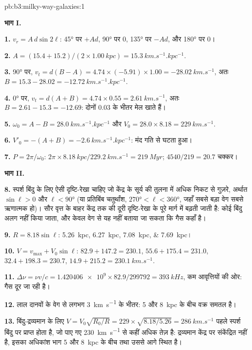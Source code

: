 \begin{solution}{pb:b3:milky-way-galaxies:1}

\textbf{भाग I.}

\textbf{1.} $v_r = A\,d\sin2\ell$: \ang{45} पर $+A d$, \ang{90} पर 0, \ang{135} पर
$-A d$, और \ang{180} पर 0।

\textbf{2.} $A = (15.4 + 15.2)/(2\times\qty{1.00}{kpc}) =
\qty{15.3}{km.s^{-1}.kpc^{-1}}$.

\textbf{3.} \ang{90} पर, $v_t = d(B - A) = 4.74\times(-5.91)\times1.00 =
\qty{-28.02}{km.s^{-1}}$, अतः $B = 15.3 - 28.02 =
\qty{-12.72}{km.s^{-1}.kpc^{-1}}$.

\textbf{4.} \ang{0} पर, $v_t = d(A + B) = 4.74\times0.55 =
\qty{2.61}{km.s^{-1}}$, अतः $B = 2.61 - 15.3 = \num{-12.69}$: दोनों
\num{0.03} के भीतर मेल खाते हैं।

\textbf{5.} $\omega_0 = A - B = \qty{28.0}{km.s^{-1}.kpc^{-1}}$ और
$V_0 = 28.0\times8.18 = \qty{229}{km.s^{-1}}$.

\textbf{6.} $V'_0 = -(A + B) = \qty{-2.6}{km.s^{-1}.kpc^{-1}}$: मंद गति से घटता हुआ।

\textbf{7.} $P = 2\pi/\omega_0$: $2\pi\times\qty{8.18}{kpc}/\qty{229.2}{km.s^{-1}}
= \qty{219}{Myr}$; $4540/219 = 20.7$ चक्कर।

\textbf{भाग II.}

\textbf{8.} स्पर्श बिंदु के लिए ऐसी दृष्टि-रेखा चाहिए जो केंद्र के
सूर्य की तुलना में अधिक निकट से गुज़रे, अर्थात $\sin\ell > 0$ और $\ell < \ang{90}$ (या
प्रतिबिंब चतुर्थांश, $\ang{270} < \ell < \ang{360}$, जहाँ सबसे बड़ा
वेग सबसे ऋणात्मक हो)। सौर वृत्त के बाहर
केंद्र तक की दूरी दृष्टि-रेखा के पूरे मार्ग में बढ़ती जाती है: कोई बिंदु
अलग नहीं किया जाता, और केवल वेग से यह नहीं बताया जा सकता कि गैस कहाँ है।

\textbf{9.} $R = 8.18\sin\ell$: \qtylist{5.26;6.27;7.08;7.69}{kpc}।

\textbf{10.} $V = v_\mathrm{max} + V_0\sin\ell$: $82.9 + 147.2 = 230.1$,
$55.6 + 175.4 = 231.0$, $32.4 + 198.3 = 230.7$, $14.9 + 215.2 =
\qty{230.1}{km.s^{-1}}$.

\textbf{11.} $\Delta\nu = \nu v/c = \num{1.420406e9}\times82.9/299792 =
\qty{393}{kHz}$, कम आवृत्तियों की ओर: गैस दूर जा रही है।

\textbf{12.} लाल दानवों के वेग से लगभग \qty{3}{km.s^{-1}} के भीतर: 5 और
\qty{8}{kpc} के बीच वक्र समतल है।

\textbf{13.} बिंदु-द्रव्यमान के लिए $V = V_0\sqrt{R_0/R} = 229\times\sqrt{8.18/5.26} =
\qty{286}{km.s^{-1}}$ पहले स्पर्श बिंदु पर प्राप्त होता है, जो
पाए गए \qty{230}{km.s^{-1}} से कहीं अधिक तेज़ है: द्रव्यमान केंद्र पर संकेंद्रित नहीं है,
इसका अधिकांश भाग 5 और \qty{8}{kpc} के बीच तथा उससे आगे स्थित है।


\end{solution}
